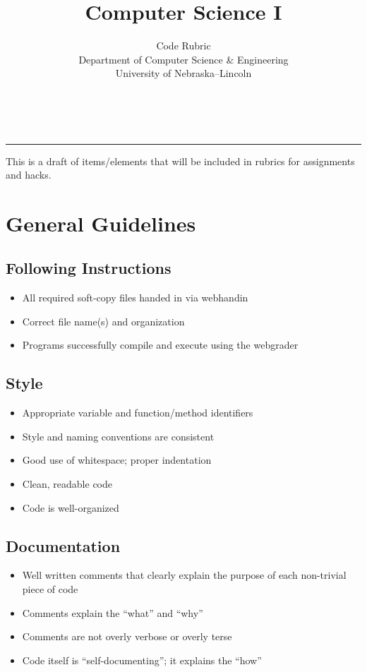 \documentclass[12pt]{scrartcl}
\title{Computer Science I}\let\Title\@title
\subtitle{Code Rubric\\
{\small
\vskip1cm
Department of Computer Science \& Engineering \\
University of Nebraska--Lincoln}
\vskip-1cm}
\date{~}
\begin{document}
\maketitle

\newwatermark[allpages=true,scale=5,textmark=Draft\\Draft\\Draft\\Draft,color=gray!15,]{}

\hrule

This is a draft of items/elements that will be included in rubrics for
assignments and hacks.

\section*{General Guidelines}

\subsection*{Following Instructions}
\begin{itemize}
  \item All required soft-copy files handed in via webhandin
  \item Correct file name(s) and organization
  \item Programs successfully compile and execute using the webgrader
\end{itemize}

\subsection*{Style}
\begin{itemize}
  \item Appropriate variable and function/method identifiers
  \item Style and naming conventions are consistent
  \item Good use of whitespace; proper indentation
  \item Clean, readable code
  \item Code is well-organized
\end{itemize}

\newpage

\subsection*{Documentation}
\begin{itemize}
  \item Well written comments that clearly explain the purpose of each non-trivial piece of code
  \item Comments explain the ``what'' and ``why''
  \item Comments are not overly verbose or overly terse
  \item Code itself is ``self-documenting''; it explains the ``how''
\end{itemize}
\end{document}
